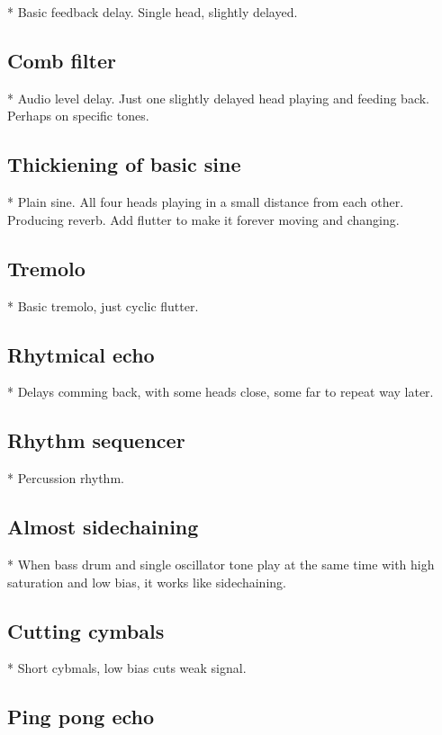 \documentclass[11pt]{article}
\begin{document}
* Basic feedback delay. Single head, slightly delayed.

\subsection{Comb filter}

* Audio level delay. Just one slightly delayed head playing and feeding back.
  Perhaps on specific tones.

\subsection{Thickiening of basic sine}

* Plain sine. All four heads playing in a small distance from each other.
  Producing reverb. Add flutter to make it forever moving and changing.

\subsection{Tremolo}

* Basic tremolo, just cyclic flutter.

\subsection{Rhytmical echo}

* Delays comming back, with some heads close, some far to repeat way later.

\subsection{Rhythm sequencer}

* Percussion rhythm.

\subsection{Almost sidechaining}

* When bass drum and single oscillator tone play at the same time with high
  saturation and low bias, it works like sidechaining.

\subsection{Cutting cymbals}

* Short cybmals, low bias cuts weak signal.

\subsection{Ping pong echo}
\end{document}
